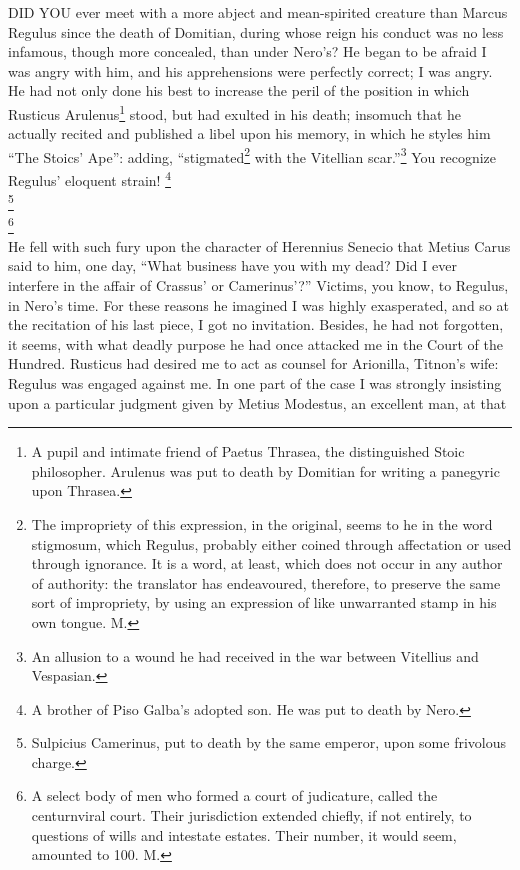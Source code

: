 
DID YOU ever meet with a more abject and mean-spirited creature than
Marcus Regulus since the death of Domitian, during whose reign his conduct
was no less infamous, though more concealed, than under Nero's? He began
to be afraid I was angry with him, and his apprehensions were perfectly
correct; I was angry. He had not only done his best to increase the peril
of the position in which Rusticus Arulenus\footnote{A pupil and intimate friend
of Paetus Thrasea, the distinguished Stoic philosopher. Arulenus was put
to death by Domitian for writing a panegyric upon Thrasea.} stood, but had exulted in
his death; insomuch that he actually recited and published a libel upon
his memory, in which he styles him ``The Stoics' Ape'': adding, ``stigmated\footnote{The impropriety of this
expression, in the original, seems to he in the word stigmosum, which
Regulus, probably either coined through affectation or used through
ignorance. It is a word, at least, which does not occur in any author of
authority: the translator has endeavoured, therefore, to preserve the same
sort of impropriety, by using an expression of like unwarranted stamp in
his own tongue. M.} with
the Vitellian scar.''\footnote{An allusion to a wound he
had received in the war between Vitellius and Vespasian.} You recognize Regulus' eloquent strain! \footnote{A brother of Piso Galba's
adopted son. He was put to death by Nero.}\\
\footnote{Sulpicius Camerinus, put to
death by the same emperor, upon some frivolous charge.}\\
\footnote{A select body of men who
formed a court of judicature, called the centurnviral court. Their
jurisdiction extended chiefly, if not entirely, to questions of wills and
intestate estates. Their number, it would seem, amounted to 100. M.}\\
He
fell with such fury upon the character of Herennius Senecio that Metius
Carus said to him, one day, ``What business have you with my dead? Did I
ever interfere in the affair of Crassus' or Camerinus'?'' Victims, you
know, to Regulus, in Nero's time. For these reasons he imagined I was
highly exasperated, and so at the recitation of his last piece, I got no
invitation. Besides, he had not forgotten, it seems, with what deadly
purpose he had once attacked me in the Court of the Hundred. Rusticus had
desired me to act as counsel for Arionilla, Titnon's wife: Regulus was
engaged against me. In one part of the case I was strongly insisting upon
a particular judgment given by Metius Modestus, an excellent man, at that
